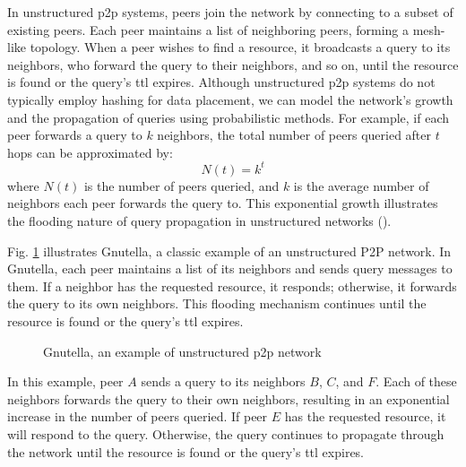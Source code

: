 In unstructured \gls{p2p} systems, peers join the network by connecting to a subset of existing peers.
Each peer maintains a list of neighboring peers, forming a mesh-like topology.
When a peer wishes to find a resource, it broadcasts a query to its neighbors, who forward the query to their neighbors, and so on, until the resource is found or the query's \gls{ttl} expires.
Although unstructured \gls{p2p} systems do not typically employ hashing for data placement, we can model the network's growth and the propagation of queries using probabilistic methods.
For example, if each peer forwards a query to $k$ neighbors, the total number of peers queried after $t$ hops can be approximated by:
\[ N(t) = k^t \]
where $N(t)$ is the number of peers queried, and $k$ is the average number of neighbors each peer forwards the query to.
This exponential growth illustrates the flooding nature of query propagation in unstructured networks (\cite{singh2020}).

Fig. \ref{fig:gnutella} illustrates Gnutella, a classic example of an unstructured P2P network.
In Gnutella, each peer maintains a list of its neighbors and sends query messages to them.
If a neighbor has the requested resource, it responds; otherwise, it forwards the query to its own neighbors.
This flooding mechanism continues until the resource is found or the query's \gls{ttl} expires.
\begin{figure}[htbp]
    \centering
    \caption{Gnutella, an example of unstructured \gls{p2p} network}
    \label{fig:gnutella}
\end{figure}

In this example, peer $A$ sends a query to its neighbors $B$, $C$, and $F$.
Each of these neighbors forwards the query to their own neighbors, resulting in an exponential increase in the number of peers queried.
If peer $E$ has the requested resource, it will respond to the query.
Otherwise, the query continues to propagate through the network until the resource is found or the query's \gls{ttl} expires.

